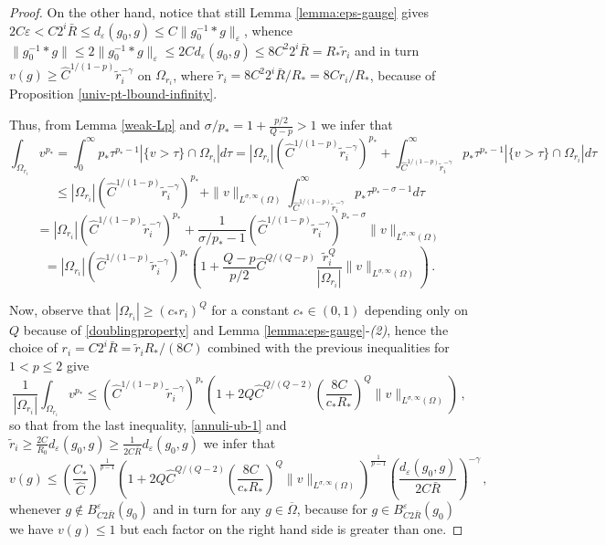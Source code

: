 \documentclass[10pt]{amsart}
\numberwithin{equation}{section}
\theoremstyle{definition}
\begin{document}
\begin{proof}
On the other hand, notice that still Lemma \ref{lemma:eps-gauge} gives $ 2C \varepsilon < C 2^i \bar{R} \leq  d_\varepsilon(g_0,g)  \leq C \| g_0^{-1}*g \|_\varepsilon$, whence $\| g_0^{-1}*g\| \leq 2 \| g_0^{-1}*g\|_\varepsilon \leq 2C d_\varepsilon(g_0,g) \leq 8 C^2 2^i \bar{R}=R_\ast \tilde{r}_i$ and in turn  $v(g) \geq \widehat{C}^{1/(1-p)} \tilde{r}_i^{-\gamma}$ on $\Omega_{r_i}$, where $\tilde{r}_i= 8 C^2 2^i \bar{R}/R_\ast =8Cr_i/R_\ast$, because of Proposition \ref{univ-pt-lbound-infinity}. 

Thus, from Lemma \ref{weak-Lp} and $\sigma/p_*=1+\frac{p/2}{Q-p}>1$ we infer that 
\[ \int_{\Omega_{r_i}}v^{p_*} = \int_0^\infty p_* \tau^{p_*-1} |\{v> \tau\} \cap \Omega_{r_i}| d\tau =|\Omega_{r_i}|  \left(\widehat{C}^{1/(1-p)} \tilde{r}_i^{-\gamma} \right)^{p_*} +\int_{\widehat{C}^{1/(1-p)} \tilde{r}_i^{-\gamma}}^\infty p_* \tau^{p_*-1} |\{v> \tau\} \cap \Omega_{r_i}| d\tau \]
\[ \leq  |\Omega_{r_i}|  \left(\widehat{C}^{1/(1-p)} \tilde{r}_i^{-\gamma} \right)^{p_*}  +\| v\|_{L^{\sigma,\infty}(\Omega)} \int_{\widehat{C}^{1/(1-p)} \tilde{r}_i^{-\gamma}}^\infty p_* \tau^{p_*-\sigma-1} d\tau\]
\[=  |\Omega_{r_i}|  \left(\widehat{C}^{1/(1-p)} \tilde{r}_i^{-\gamma} \right)^{p_*} +\frac{1}{\sigma/p_*-1} \left(  \widehat{C}^{1/(1-p)} \tilde{r}_i^{-\gamma} \right)^{p_*-\sigma} \| v\|_{L^{\sigma,\infty}(\Omega)}\]
\[ = |\Omega_{r_i}|  \left(\widehat{C}^{1/(1-p)} \tilde{r}_i^{-\gamma} \right)^{p_*} \left(1 +\frac{Q-p}{p/2} \widehat{C}^{Q/(Q-p)} \frac{\tilde{r}_i^{Q}}{|\Omega_{r_i}|} \| v\|_{L^{\sigma,\infty}(\Omega)} \right)\, .\]

Now, observe that $|\Omega_{r_i}| \geq (c_* r_i)^Q$ for a constant $c_*\in (0,1)$ depending only on $Q$ because of \eqref{doublingproperty} and Lemma \ref{lemma:eps-gauge}-{\it (2)}, hence the choice of $r_i=C2^i \bar{R}=\tilde{r}_i R_\ast/(8C) $ combined with the previous inequalities for $1<p\leq 2$ give 
\[ \frac{1}{|\Omega_{r_i} |} \int_{\Omega_{r_i}}v^{p_*} \leq  \left(\widehat{C}^{1/(1-p)} \tilde{r}_i^{-\gamma} \right)^{p_*}
\left(1 +2Q \widehat{C}^{Q/(Q-2)} \left(\frac{8C}{c_*R_\ast}\right)^Q \| v\|_{L^{\sigma,\infty}(\Omega)}  \right) \, ,\]
so that from the last inequality, \eqref{annuli-ub-1} and $\tilde{r}_i \geq \frac{2C}{R_0}d_\varepsilon(g_0,g) \geq \frac{1}{2C\bar{R}} d_\varepsilon(g_0,g)$ we infer that
\begin{equation}
\label{annuli-ub-2}
v (g)\leq \left( \frac{C_*}{\widehat{C}}\right)^\frac{1}{p-1}  \left(1 +2Q \widehat{C}^{Q/(Q-2)} \left(\frac{8C}{c_*R_\ast}\right)^Q \| v\|_{L^{\sigma,\infty}(\Omega)}  \right)^{\frac{1}{p-1}}  \left( \frac{ d_\varepsilon(g_0,g)}{2C \bar{R}}\right)^{-\gamma} \, ,
\end{equation}
whenever $g \not \in B^\varepsilon_{C2\bar{R}}(g_0) $ and in turn for any $g \in \overline{\Omega}$, because for $g \in B^\varepsilon_{C2\bar{R}}(g_0)$ we have $v(g) \leq 1$ but each factor on the right hand side is greater than one. 



\end{proof}
\end{document}
